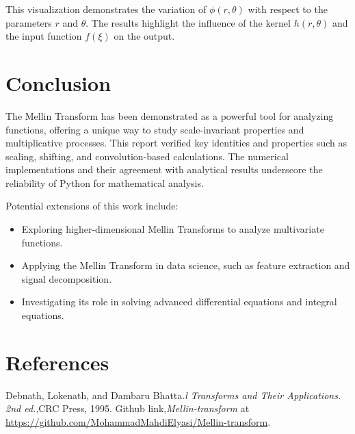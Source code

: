 \documentclass[a4paper, 12pt]{article}
\begin{document}
This visualization demonstrates the variation of $\phi(r, \theta)$ with respect to the parameters $r$ and $\theta$. The results highlight the influence of the kernel $h(r, \theta)$ and the input function $f(\xi)$ on the output.

\section{Conclusion}
The Mellin Transform has been demonstrated as a powerful tool for analyzing functions, offering a unique way to study scale-invariant properties and multiplicative processes. This report verified key identities and properties such as scaling, shifting, and convolution-based calculations. The numerical implementations and their agreement with analytical results underscore the reliability of Python for mathematical analysis.

Potential extensions of this work include:
\begin{itemize}
    \item Exploring higher-dimensional Mellin Transforms to analyze multivariate functions.
    \item Applying the Mellin Transform in data science, such as feature extraction and signal decomposition.
    \item Investigating its role in solving advanced differential equations and integral equations.
\end{itemize}

\newpage

\clearpage

\section{References}

\begin{thebibliography}{99}
     Debnath, Lokenath, and Dambaru Bhatta.\textit{l Transforms and Their Applications. 2nd ed.},CRC Press, 1995.
     Github link,\textit{Mellin-transform} at \url{https://github.com/MohammadMahdiElyasi/Mellin-transform}.

\end{thebibliography}
\end{document}
